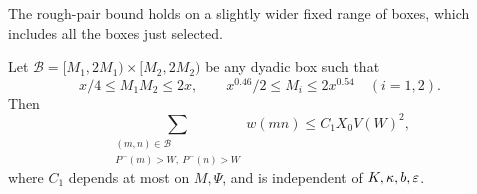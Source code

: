 The rough-pair bound holds on a slightly wider fixed range of boxes,
which includes all the boxes just selected.
\begin{lemma}\label{con:rough-pairs}
Let \(\mathcal B=[M_1,2M_1)\times[M_2,2M_2)\) be any dyadic box
such that
\begin{equation}\label{con:rough-box-range}
 x/4\le M_1M_2\le2x,\qquad
 x^{0.46}/2\le M_i\le2x^{0.54}\quad(i=1,2).
\end{equation}
Then
\begin{equation}\label{con:rough-pair-bound}
 \sum_{\substack{(m,n)\in\mathcal B\\P^-(m)>W,\ P^-(n)>W}}w(mn)
       \le C_1X_0V(W)^2,
\end{equation}
where \(C_1\) depends at most on \(M,\Psi\), and is independent
of \(K,\kappa,b,\varepsilon\).
\end{lemma}

